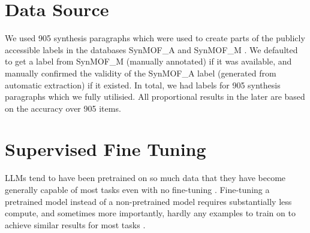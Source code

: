 



\section{Data Source}\label{sec:data}
We used 905 synthesis paragraphs which were used to create parts of the publicly accessible labels in the databases SynMOF\_A and SynMOF\_M \cite{luo_mof_2022}.
We defaulted to get a label from SynMOF\_M (manually annotated) if it was available, and manually confirmed the validity of the SynMOF\_A label (generated from automatic extraction) if it existed.
In total, we had labels for 905 synthesis paragraphs which we fully utilisied.
All proportional results in the later  are based on the accuracy over 905 items.

\section{Supervised Fine Tuning}\label{sec:sft}
\glspl{LLM} tend to have been pretrained on so much data that they have become generally capable of most tasks even with no fine-tuning \cite{brown_language_2020}.
Fine-tuning a pretrained model instead of a non-pretrained model requires substantially less compute, and sometimes more importantly, hardly any examples to train on to achieve similar results for most tasks \cite{gaddipati_comparative_2020}.

